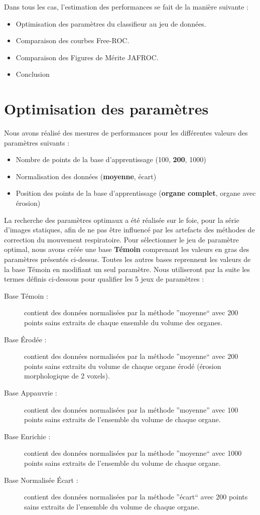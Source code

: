 Dans tous les cas, l'estimation des performances se fait de la manière suivante :

\begin{itemize}
 \item Optimisation des paramètres du classifieur au jeu de données.
 \item Comparaison des courbes Free-ROC.
 \item Comparaison des Figures de Mérite JAFROC.
 \item Conclusion
\end{itemize}


\section{Optimisation des paramètres}

Nous avons réalisé des mesures de performances pour les différentes valeurs des paramètres suivants :

\begin{itemize}
 \item Nombre de points de la base d'apprentissage (100, \textbf{200}, 1000)
 \item Normalisation des données (\textbf{moyenne}, écart)
 \item Position des points de la base d'apprentissage (\textbf{organe complet}, organe avec érosion)
\end{itemize}

La recherche des paramètres optimaux a été réalisée sur le foie, pour la série d'images statiques, afin de ne pas être influencé par les artefacts des méthodes de correction du mouvement respiratoire. Pour sélectionner le jeu de paramètre optimal, nous avons créée une base \textbf{Témoin} comprenant les valeurs en gras des paramètres présentés ci-dessus. Toutes les autres bases reprennent les valeurs de la base Témoin en modifiant un seul paramètre. Nous utiliseront par la suite les termes définis ci-dessous pour qualifier les 5 jeux de paramètres :

\begin{description}
 \item[Base Témoin : ] contient des données normalisées par la méthode ''moyenne`` avec 200 points sains extraits de chaque ensemble du volume des organes.
 \item[Base Érodée : ] contient des données normalisées par la méthode ''moyenne`` avec 200 points sains extraits du volume de chaque organe érodé (érosion morphologique de 2 voxels).
 \item[Base Appauvrie : ] contient des données normalisées par la méthode ''moyenne'' avec 100 points sains extraits de l'ensemble du volume de chaque organe.
 \item[Base Enrichie : ] contient des données normalisées par la méthode ''moyenne`` avec 1000 points sains extraits de l'ensemble du volume de chaque organe.
 \item[Base Normalisée \'Ecart : ] contient des données normalisées par la méthode ''écart`` avec 200 points sains extraits de l'ensemble du volume de chaque organe.
\end{description}

